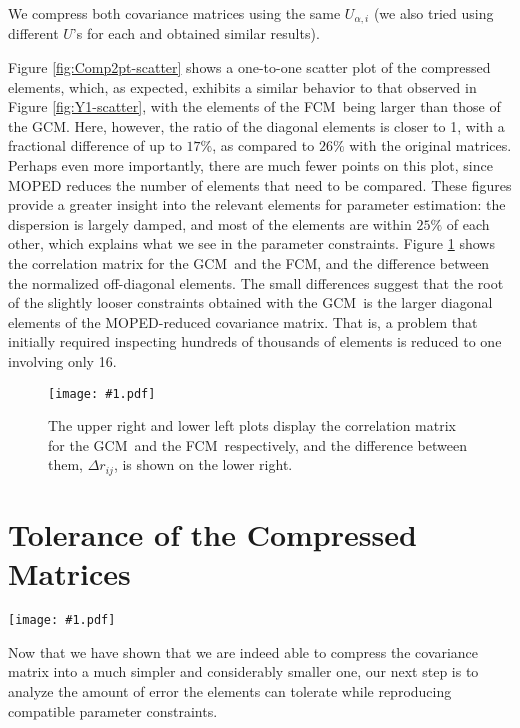 \documentclass[aps, prd, twocolumn, superscriptaddress, nofootinbib, amssymb, amsmath]{revtex4-2}
\newcommand{\sfig}[3]{
	\texttt{[image: \#1.pdf]}
	\caption{#3}
	\label{fig:#1}
}
\newcommand{\Sfig}[3]{
	\begin{figure}[#1]
		\sfig{#2}{\columnwidth}{#3}
	\end{figure}
}
\newcommand{\Swide}[3]{
	\begin{figure*}[#1]
		\sfig{#2}{\textwidth}{#3}
	\end{figure*}
}
\newcommand{\rf}[1]{Figure \ref{fig:#1}}
\newcommand\full{the FCM}
\newcommand\gaussian{the GCM}
\begin{document}
We compress both covariance matrices using the same $U_{\alpha, i}$ (we also tried using different $U$'s for each and obtained similar results).

\rf{Comp2pt-scatter} shows a one-to-one scatter plot of the compressed elements, which, as expected, exhibits a similar behavior to that observed in \rf{Y1-scatter}, with the elements of \full\ being larger than those of \gaussian. Here, however, the ratio of the diagonal elements is closer to 1, with a fractional difference of up to $17\%$, as compared to $26\%$ with the original matrices. Perhaps even more importantly, there are much fewer points on this plot, since MOPED reduces the number of elements that need to be compared. These figures provide a greater insight into the relevant elements for parameter estimation: the dispersion is largely damped, and most of the elements are within $25\%$ of each other, which explains what we see in the parameter constraints. \rf{Comp2pt-correlation} shows the correlation matrix for \gaussian\ and \full, and the difference between the normalized off-diagonal elements. The small differences suggest that the root of the slightly looser constraints obtained with \gaussian\ is the larger diagonal elements of the MOPED-reduced covariance matrix. That is, a problem that initially required inspecting hundreds of thousands of elements is reduced to one involving only 16.

\Sfig{thbp}{Comp2pt-correlation}{The upper right and lower left plots display the correlation matrix for \gaussian\ and \full\ respectively, and the difference between them, $\Delta r_{ij}$, is shown on the lower right.}

\section{Tolerance of the Compressed Matrices}\label{sec:tolerance}

\Swide{thbp}{Tolerance_constraints}{An error plot showing the changes to the constraints for $\Omega_m$, $S_8$ and $A_{\text{IA}}$ for errors added at $5\%, 10\%, 15\%, 25\%, 30\%, 35\%, 40\%$ and $45\%$ of the original elements (in purple) and eigenvalues (in green) of the compressed covariance matrix. The blue rectangle covers the 68\% CL interval obtained for \full, and the darker blue vertical line shows the mean value for the respective parameter.}

Now that we have shown that we are indeed able to compress the covariance matrix into a much simpler and considerably smaller one, our next step is to analyze the amount of error the elements can tolerate while reproducing compatible parameter constraints.
\end{document}
